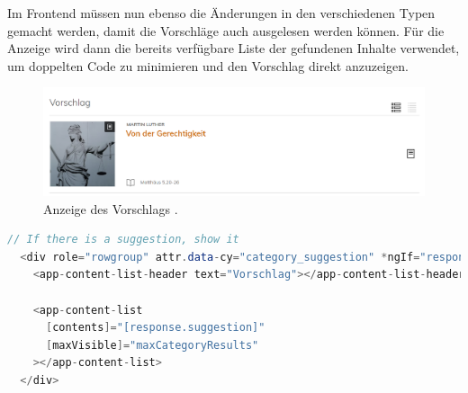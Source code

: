 \clearpage
Im Frontend müssen nun ebenso die Änderungen in den verschiedenen Typen gemacht werden, damit die Vorschläge auch ausgelesen werden können.
Für die Anzeige wird dann die bereits verfügbare Liste der gefundenen Inhalte verwendet, um doppelten Code zu minimieren und den Vorschlag direkt anzuzeigen.


\begin{figure}[h]
  \begin{centering}
    \includegraphics[width=\textwidth]{figures/development/suggestion.png}
    \caption{Anzeige des Vorschlags \cite{pfleiderer2022}.}
    \label{fig:suggestion}
  \end{centering}
\end{figure}


\begin{lstlisting}[language=Java, label={code:suggestionRow}, title={Code für Anzeige des Vorschlage \cite{frontend2022}}]
  // If there is a suggestion, show it
  <div role="rowgroup" attr.data-cy="category_suggestion" *ngIf="response.suggestion">
    <app-content-list-header text="Vorschlag"></app-content-list-header>

    <app-content-list
      [contents]="[response.suggestion]"
      [maxVisible]="maxCategoryResults"
    ></app-content-list>
  </div>
\end{lstlisting}
